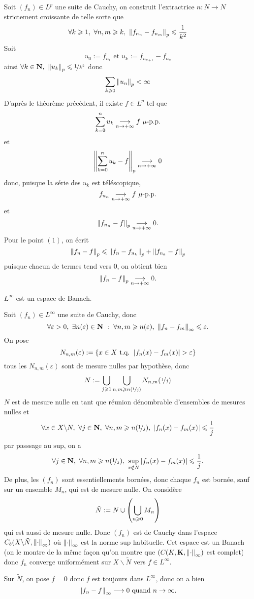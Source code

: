 \documentclass[a4paper,11pt, twoside]{article}
\begin{document}
\begin{Proof}
  Soit $(f_n)\in L^p$ une suite de Cauchy, on construit l'extractrice $n:N\longrightarrow N$ strictement croissante de telle sorte que 
  $$\forall k\geqslant 1,\ \forall n,m\geqslant k,\ \norm{f_{n_n}-f_{n_m}}_p\leqslant\frac{1}{k^2}$$
  Soit 
  $$u_0:=f_{n_1}\text{ et }u_k:=f_{n_{k+1}}-f_{n_k}$$
  ainsi $\forall k\in \mathbf N,\ \left\lVert u_k\right\rVert_p\leqslant \nicefrac{1}{k^2}$ donc 
  $$\sum_{k\geqslant 0}\left\lVert u_n\right\rVert_p<\infty$$
  D'après le théorème précédent, il existe $f\in L^p$ tel que 
  $$\sum_{k=0}^nu_k\tend f\ \mu\text{-p.p.}$$
  et
  $$\left\lVert\sum_{k=0}^n u_k-f\right\rVert_p\underset{n\to+\infty}{\longrightarrow} 0$$
  donc, puisque la série des $u_k$ est téléscopique, 
  $$f_{n_n}\tend f\ \mu\text{-p.p.}$$
  et 
  $$\left\lVert f_{n_n}-f\right\rVert_p\underset{n\to+\infty}{\longrightarrow} 0.$$
  Pour le point $(\mathit 1)$, on écrit 
  $$\left\lVert f_n-f\right\rVert_p\leqslant \left\lVert f_n-f_{n_k}\right\rVert_p+\left\lVert f_{n_k}-f\right\rVert_p$$
  puisque chacun de termes tend vers 0, on obtient bien 
  $$\left\lVert f_n-f\right\rVert_p\underset{n\to+\infty}{\longrightarrow} 0.$$
\end{Proof}


\begin{Th}
  $L^\infty$ est un espace de Banach.
\end{Th}


\begin{Proof}
  Soit $(f_n)\in L^\infty$ une suite de Cauchy, donc 
  $$\forall\varepsilon>0,\ \exists n(\varepsilon)\in\N\ :\ \forall n,m\geqslant n(\varepsilon),\ \norm{f_n-f_m}_\infty\leqslant \varepsilon.$$
  On pose 
  $$N_{n,m}(\varepsilon):=\ens{x\in X\tq \abs{f_n(x)-f_m(x)}>\varepsilon}$$
  tous les $N_{n,m}(\varepsilon)$ sont de mesure nulles par hypothèse, donc 
  $$N:=\bigcup_{j\geqslant 1}\bigcup_{n,m\geqslant n(\nicefrac1j)}N_{n,m}(\nicefrac1j)$$
  $N$ est de mesure nulle en tant que réunion dénombrable d'ensembles de mesures nulles et 
  $$\forall x\in X\backslash N,\ \forall j\in\N,\ \forall n,m\geqslant n(\nicefrac1j),\ \abs{f_n(x)-f_m(x)}\leqslant\frac1j$$
  par passsage au $\mathrm{sup}$, on a 
  $$\forall j\in\mathbf N,\ \forall n,m\geqslant n(\nicefrac1j),\ \underset{x\notin N}{\mathrm{sup}}\left| f_n(x)-f_m(x)\right|\leqslant\frac1j.$$
  De plus, les $(f_n)$ sont essentiellements bornées, donc chaque $f_n$ est bornée, sauf sur un ensemble $M_n$, qui est de mesure nulle.
  On considère 
  $$\tilde N:=N\cup\left(\bigcup_{n\geqslant 0}M_n\right)$$
  qui est aussi de mesure nulle.
  Donc $(f_n)$ est de Cauchy dans l'espace $C_b(X\backslash \tilde N,\left\lVert\cdot\right\rVert_\infty)$ où $\left\lVert\cdot\right\rVert_\infty$ est la norme $\mathrm{sup}$ habituelle. Cet espace est un Banach (on le montre de la même façon qu'on montre que $(C(K,\mathbf K,\left\lVert\cdot\right\rVert_\infty)$ est complet) donc $f_n$ converge uniformément sur $X\backslash \tilde N$ vers $f\in L^{\infty}$.

  Sur $\tilde N$, on pose $f=0$ donc $f$ est toujours dans $L^\infty$, donc on a bien 
  $$\left\lVert f_n-f\right\rVert_\infty\longrightarrow 0\text{ quand }n\to\infty.$$
\end{Proof}
\end{document}
